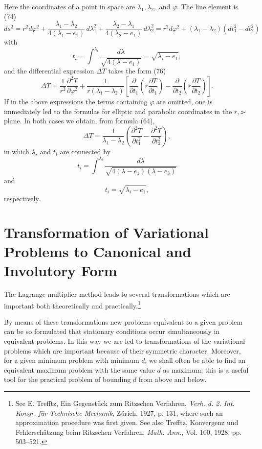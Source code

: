 Here the coordinates of a point in space are $\lambda_1,\lambda_2,$ and $\varphi$. The line element is (74)
\[
ds^2=r^2d\varphi^2+\frac{\lambda_1-\lambda_2}{4(\lambda_1-e_1)}\,d\lambda_1^2
+\frac{\lambda_2-\lambda_1}{4(\lambda_2-e_1)}\,d\lambda_2^2
=r^2d\varphi^2+(\lambda_1-\lambda_2)(dt_1^2-dt_2^2)
\]
with
\begin{equation}\tag{79}
t_i=\int^{\lambda_i}\frac{d\lambda}{\sqrt{4(\lambda-e_1)}}=\sqrt{\lambda_i-e_1},
\end{equation}
and the differential expression $\Delta T$ takes the form (76)
\[
\Delta T=\frac1{r^2}\frac{\partial^2T}{\partial\varphi^2}
+\frac1{r(\lambda_1-\lambda_2)}\left[\frac{\partial}{\partial t_1}\left(r\frac{\partial T}{\partial t_1}\right)-\frac{\partial}{\partial t_2}\left(r\frac{\partial T}{\partial t_2}\right)\right].
\]
If in the above expressions the terms containing $\varphi$ are omitted, one is immediately led to the formulas for elliptic and parabolic coordinates in the $r,z$-plane. In both cases we obtain, from formula (64),
\[
\Delta T=\frac1{\lambda_1-\lambda_2}\left(\frac{\partial^2T}{\partial t_1^2}-\frac{\partial^2T}{\partial t_2^2}\right),
\]
in which $\lambda_i$ and $t_i$ are connected by
\[
t_i=\int^{\lambda_i}\frac{d\lambda}{\sqrt{4(\lambda-e_1)(\lambda-e_3)}}
\]
and
\[
t_i=\sqrt{\lambda_i-e_1},
\]
respectively.

\section{Transformation of Variational Problems to Canonical and Involutory Form}
The Lagrange multiplier method leads to several transformations which are important both theoretically and practically.\footnote{See E. Trefftz, Ein Gegenst\"uck zum Ritzschen Verfahren, \emph{Verh. d. 2. Int. Kongr. f\"ur Technische Mechanik}, Z\"urich, 1927, p. 131, where such an approximation procedure was first given. See also Trefftz, Konvergenz und Fehlersch\"atzung beim Ritzschen Verfahren, \emph{Math. Ann.}, Vol. 100, 1928, pp. 503--521.}

By means of these transformations new problems equivalent to a given problem can be so formulated that stationary conditions occur simultaneously in equivalent problems. In this way we are led to transformations of the variational problems which are important because of their symmetric character. Moreover, for a given minimum problem with minimum $d$, we shall often be able to find an equivalent maximum problem with the same value $d$ as maximum; this is a useful tool for the practical problem of bounding $d$ from above and below.

